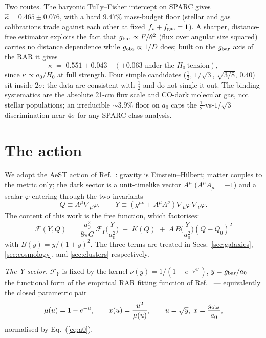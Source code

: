 \documentclass[aps,prd,twocolumn,10pt,nofootinbib,superscriptaddress]{revtex4-2}
\newcommand{\FF}{\mathcal{F}}
\begin{document}
Two routes. The baryonic Tully--Fisher intercept on SPARC gives $\hat\kappa=0.465\pm0.076$, with a
hard $9.47\%$ mass-budget floor (stellar and gas calibrations trade against each other at fixed
$f_\star+f_{\rm gas}=1$). A sharper, distance-free estimator exploits the fact that
$g_{\rm bar}\propto F/\theta^2$ (flux over angular size squared) carries no distance dependence
while $g_{\rm obs}\propto1/D$ does; built on the $g_{\rm bar}$ axis of the RAR it gives
\begin{equation}
\kappa \;=\; 0.551\pm0.043 \quad (\pm0.063~\text{under the } H_0~\text{tension}),
\end{equation}
since $\kappa\propto a_0/H_0$ at full strength. Four simple candidates
($\tfrac12$, $1/\sqrt3$, $\sqrt{3/8}$, $0.40$) sit inside $2\sigma$: the data are consistent with
$\tfrac12$ and do not single it out. The binding systematics are the absolute 21-cm flux scale and
CO-dark molecular gas, not stellar populations; an irreducible $\sim3.9\%$ floor on $a_0$ caps the
$\tfrac12$-vs-$1/\sqrt3$ discrimination near $4\sigma$ for any SPARC-class analysis.

\section{The action}
\label{sec:action}

We adopt the AeST action of Ref.~\cite{SZ2021}: gravity is Einstein--Hilbert; matter couples to the
metric only; the dark sector is a unit-timelike vector $A^\mu$ ($A^\mu A_\mu=-1$) and a scalar
$\varphi$ entering through the two invariants
\begin{equation}
Q \equiv A^\mu\nabla_\mu\varphi, \qquad
Y \equiv (g^{\mu\nu}+A^\mu A^\nu)\nabla_\mu\varphi\,\nabla_\nu\varphi .
\end{equation}
The content of this work is the free function, which factorises:
\begin{equation}
\boxed{\;\FF(Y,Q) \;=\; \frac{a_0^2}{8\pi G}\,\FF_Y\!\Big(\frac{Y}{a_0^2}\Big)
\;+\; K(Q) \;+\; A\,B\!\Big(\frac{Y}{a_0^2}\Big)(Q-Q_0)^2\;}
\label{eq:F}
\end{equation}
with $B(y)=y/(1+y)^2$. The three terms are treated in Secs.~\ref{sec:galaxies},
\ref{sec:cosmology}, and \ref{sec:clusters} respectively.

\emph{The Y-sector.} $\FF_Y$ is fixed by the kernel $\nu(y)=1/(1-e^{-\sqrt y})$,
$y=g_{\rm bar}/a_0$ --- the functional form of the empirical RAR fitting function of
Ref.~\cite{McGaugh2016} --- equivalently the closed parametric pair
\begin{equation}
\mu(u)=1-e^{-u},\qquad x(u)=\frac{u^2}{\mu(u)},\qquad u=\sqrt y,\; x=\frac{g_{\rm obs}}{a_0},
\label{eq:kernel}
\end{equation}
normalised by Eq.~(\ref{eq:a0}).
\end{document}
